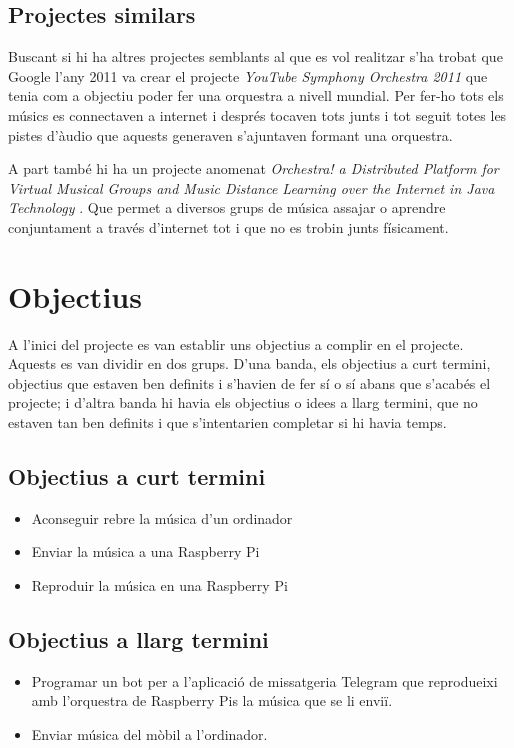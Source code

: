 \documentclass[a4paper]{paper}
\let\oldsection\section
\renewcommand\section{\clearpage\oldsection}
\begin{document}
\subsection{Projectes similars}

Buscant si hi ha altres projectes semblants al que es vol realitzar s'ha trobat que Google l'any 2011 va crear el projecte \emph{YouTube Symphony Orchestra 2011}\cite{YoutubeSymphoni} que tenia com a objectiu poder fer una orquestra a nivell mundial. Per fer-ho tots els músics es connectaven a internet i després tocaven tots junts i tot seguit totes les pistes d'àudio que aquests generaven s'ajuntaven formant una orquestra.

A part també hi ha un projecte anomenat \emph{Orchestra! a Distributed Platform for Virtual Musical Groups and Music Distance Learning over the Internet in Java \texttrademark Technology} \cite{Orchestra}. Que permet a diversos grups de música assajar o aprendre conjuntament a través d'internet tot i que no es trobin junts físicament.

\section{Objectius}
A l'inici del projecte es van establir uns objectius a complir en el projecte. Aquests es van dividir en dos grups. D'una banda, els objectius a curt termini, objectius que estaven ben definits i s'havien de fer sí o sí abans que s'acabés el projecte; i d'altra banda hi havia els objectius o idees a llarg termini, que no estaven tan ben definits i que s'intentarien completar si hi havia temps.

\subsection{Objectius a curt termini}
\begin{itemize}
	\item Aconseguir rebre la música d'un ordinador
	\item Enviar la música a una Raspberry Pi
	\item Reproduir la música en una Raspberry Pi
\end{itemize}

\subsection{Objectius a llarg termini}
\begin{itemize}
	\item Programar un bot per a l'aplicació de missatgeria Telegram que reprodueixi amb l'orquestra de Raspberry Pis la música que se li enviï.
	\item Enviar música del mòbil a l'ordinador.
\end{itemize}
\end{document}
